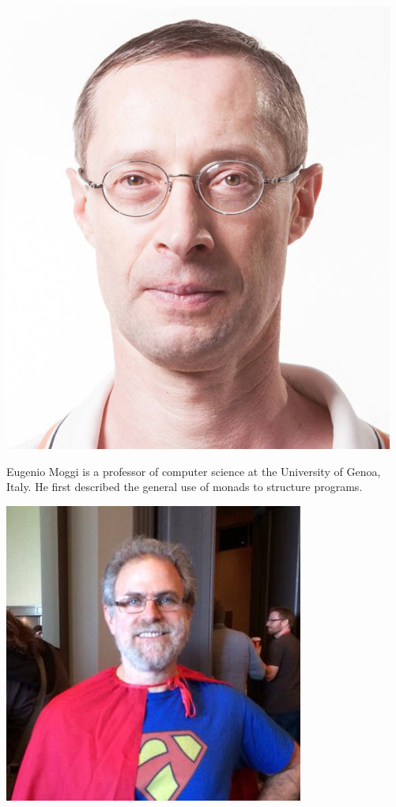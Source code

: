 \documentclass[12pt]{article}
\theoremstyle{definition}
\begin{document}
\begin{center}
\includegraphics[scale=0.3]{moggi}
\end{center}

Eugenio Moggi is a professor of computer science at the University of Genoa, Italy.
He first described the general use of monads to structure programs.

\begin{center}
\includegraphics[scale=0.45]{wadler}
\end{center}
\end{document}
